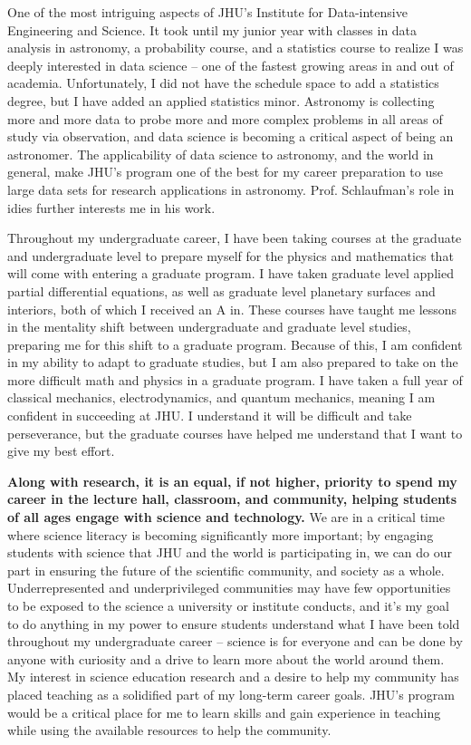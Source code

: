 \documentclass[11pt,letterpaper]{article}
\begin{document}
One of the most intriguing aspects of JHU's Institute for Data-intensive Engineering and Science. It took until my junior year with classes in data analysis in astronomy, a probability course, and a statistics course to realize I was deeply interested in data science -- one of the fastest growing areas in and out of academia. Unfortunately, I did not have the schedule space to add a statistics degree, but I have added an applied statistics minor. Astronomy is collecting more and more data to probe more and more complex problems in all areas of study via observation, and data science is becoming a critical aspect of being an astronomer. The applicability of data science to astronomy, and the world in general, make JHU's program one of the best for my career preparation to use large data sets for research applications in astronomy. Prof. Schlaufman's role in idies further interests me in his work. 

Throughout my undergraduate career, I have been taking courses at the graduate and undergraduate level to prepare myself for the physics and mathematics that will come with entering a graduate program. I have taken graduate level applied partial differential equations, as well as graduate level planetary surfaces and interiors, both of which I received an A in. These courses have taught me lessons in the mentality shift between undergraduate and graduate level studies, preparing me for this shift to a graduate program. Because of this, I am confident in my ability to adapt to graduate studies, but I am also prepared to take on the more difficult math and physics in a graduate program. I have taken a full year of classical mechanics, electrodynamics, and quantum mechanics, meaning I am confident in succeeding at JHU. I understand it will be difficult and take perseverance, but the graduate courses have helped me understand that I want to give my best effort.

\textbf{Along with research, it is an equal, if not higher, priority to spend my career in the lecture hall, classroom, and community, helping students of all ages engage with science and technology.} We are in a critical time where science literacy is becoming significantly more important; by engaging students with science that JHU and the world is participating in, we can do our part in ensuring the future of the scientific community, and society as a whole. Underrepresented and underprivileged communities may have few opportunities to be exposed to the science a university or institute conducts, and it’s my goal to do anything in my power to ensure students understand what I have been told throughout my undergraduate career -- science is for everyone and can be done by anyone with curiosity and a drive to learn more about the world around them. My interest in science education research and a desire to help my community has placed teaching as a solidified part of my long-term career goals. JHU’s program would be a critical place for me to learn skills and gain experience in teaching while using the available resources to help the community.
\end{document}
